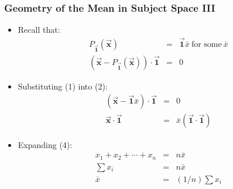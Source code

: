 \documentclass{beamer}
\begin{document}
\begin{frame}
  \frametitle{Geometry of the Mean in Subject Space III}

\begin{itemize}
\item Recall that:
\begin{eqnarray}
P_{\vec{\mathbf{1}}}(\vec{\mathbf{x}}) & = & \vec{\mathbf{1}}\bar{x} \ \mbox{for some}\ \bar{x} \\
%
(\vec{\mathbf{x}} - P_{\vec{\mathbf{1}}}(\vec{\mathbf{x}})) \cdot \vec{\mathbf{1}} & = & 0
\end{eqnarray}

\item Substituting (1) into (2):
\begin{eqnarray}
(\vec{\mathbf{x}} - \vec{\mathbf{1}}\bar{x}) \cdot \vec{\mathbf{1}} & = & 0 \\
%
\vec{\mathbf{x}} \cdot \vec{\mathbf{1}} & = & \bar{x} (\vec{\mathbf{1}} \cdot \vec{\mathbf{1}})
\end{eqnarray}

\item Expanding (4):
\begin{eqnarray}
x_1 + x_2 + \cdots + x_n & = & n \bar{x} \\
%
\sum x_i & = & n \bar{x} \\
%
\bar{x} & = & (1/n) \sum x_i
\end{eqnarray}

\end{itemize}


\end{frame}
\end{document}
